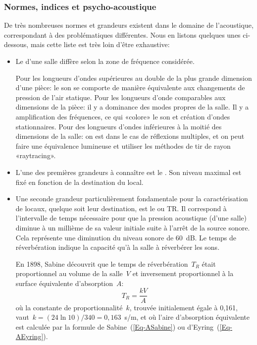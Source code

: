 \medskip
\subsubsection{Normes, indices et psycho-acoustique}

De très nombreuses normes et grandeurs existent dans le domaine de l'acoustique, correspondant à des problématiques différentes. Nous en listons quelques unes ci-dessous, mais cette liste est très loin d'être exhaustive:
\begin{itemize}
   \item Le  d'une salle diffère selon la zone de fréquence considérée.
   
Pour les longueurs d'ondes supérieures au double de la plus grande dimension d'une pièce: le son se comporte de manière équivalente aux changements de pression de l'air statique.
Pour les longueurs d'onde comparables aux dimensions de la pièce: il y a dominance des modes propres de la salle. Il y a amplification des fréquences, ce qui «colore» le son et création d'ondes stationnaires.
Pour des longueurs d'ondes inférieures à la moitié des dimensions de la salle: on est dans le cas de réflexions multiples, et on peut faire une équivalence lumineuse et utiliser les méthodes de tir de rayon «raytracing».

   \item L'une des premières grandeurs à connaître est le . Son niveau maximal est fixé en fonction de la destination du local.

   \item Une seconde grandeur particulièrement fondamentale pour la caractérisation de locaux, quelque soit leur destination, est le  ou TR.  Il correspond à l'intervalle de temps nécessaire pour que la pression acoustique (d'une salle) diminue à un millième de sa valeur initiale suite à l'arrêt de la source sonore. Cela représente une diminution du niveau sonore de 60~dB. Le temps de réverbération indique la capacité qu'à la salle à réverbérer les sons.
   
En 1898, Sabine découvrit que le temps de réverbération~$T_R$ était proportionnel au volume de la salle~$V$ et inversement proportionnel à la surface équivalente d'absorption~$A$:
   \begin{equation}
    T_R = \frac{k V}{A} 
   \end{equation}
où la constante de proportionnalité~$k$, trouvée initialement égale à 0,161, vaut~$k=(24\ln10)/340 =0,163$~s/m, et où l'aire d'absorption équivalente est calculée par la formule de Sabine~(\ref{Eq-ASabine}) ou d'Eyring~(\ref{Eq-AEyring}).


\end{itemize}
